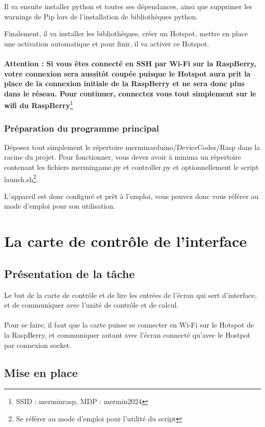 \documentclass[11pt]{article}
\begin{document}
Il va ensuite installer python et toutes ses dépendances, ainsi que supprimer les warnings de Pip lors de l'installation de bibliothèques python.

Finalement, il va installer les bibliothèques, créer un Hotspot, mettre en place une activation automatique et pour finir, il va activer ce Hotspot.
\\
\\
\textbf{Attention : Si vous êtes connecté en SSH par Wi-Fi sur la RaspBerry, votre connexion sera aussitôt coupée puisque le Hotspot aura prit la place de la connexion initiale de la RaspBerry et ne sera donc plus dans le réseau. Pour continuer, connectez vous tout simplement sur le wifi du RaspBerry}\footnote{SSID : merminrasp, MDP : mermin2024}

\subsubsection{Préparation du programme principal}

Déposez tout simplement le répertoire merminarduino/DeviceCodes/Rasp dans la racine du projet. Pour fonctionner, vous devez avoir à minima un répertoire contenant les fichiers mermingame.py et controller.py et optionnellement le script launch.sh\footnote{Se référer au mode d'emploi pour l'utilité du script}.

L'appareil est donc configuré et prêt à l'emploi, vous pouvez donc vous référer au mode d'emploi pour son utilisation.

\newpage

\section{La carte de contrôle de l'interface}

\subsection{Présentation de la tâche}

Le but de la carte de contrôle et de lire les entrées de l'écran qui sert d'interface, et de communiquer avec l'unité de contrôle et de calcul.
\\
\\
Pour se faire, il faut que la carte puisse se connecter en Wi-Fi sur le Hotspot de la RaspBerry, et communiquer autant avec l'écran connecté qu'avec le Hostpot par connexion socket.

\subsection{Mise en place}
\end{document}
